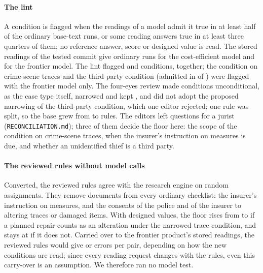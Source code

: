 \paragraph{The lint}
A condition is flagged when the readings of a model admit it true in at least half of the ordinary base-text runs, or some reading answers true in at least three quarters of them; no reference answer, score or designed value is read. The stored readings of the tested commit give \fuLintOffRunsLuna{} ordinary runs for the cost-efficient model and \fuLintOffRunsTerra{} for the frontier model. The lint flagged \fuLintFlaggedLuna{} and \fuLintFlaggedTerra{} conditions, \fuLintFlaggedAll{} together; the condition on crime-scene traces and the third-party condition (admitted in \fuLintGFortyTwoTerra{} of \fuLintOffRunsTerra) were flagged with the frontier model only. The four-eyes review made \fuLintCaseType{} conditions unconditional, as the case type itself, narrowed \fuLintNarrowed{} and kept \fuLintKept, and did not adopt the proposed narrowing of the third-party condition, which one editor rejected; one rule was split, so the base grew from \fuLintRulesBefore{} to \fuLintRulesAfter{} rules. The editors left questions for a jurist (\texttt{RECONCILIATION.md}); three of them decide the floor here: the scope of the condition on crime-scene traces, when the insurer's instruction on measures is due, and whether an unidentified thief is a third party.

\paragraph{The reviewed rules without model calls}
Converted, the reviewed rules agree with the research engine on \fuLintEngineAssignments{} random assignments. They remove \fuLintDocsLeave{} documents from every ordinary checklist: the insurer's instruction on measures, and the consents of the police and of the insurer to altering traces or damaged items. With designed values, the floor rises from \fuLintFloorBefore{} to \fuLintFloorAfter{} if a planned repair counts as an alteration under the narrowed trace condition, and stays at \fuLintFloorAfterLow{} if it does not. Carried over to the frontier product's stored readings, the reviewed rules would give \fuLintPredTerraNever{} or \fuLintPredTerraDesign{} errors per pair, depending on how the new conditions are read; since every reading request changes with the rules, even this carry-over is an assumption. We therefore ran no model test.

